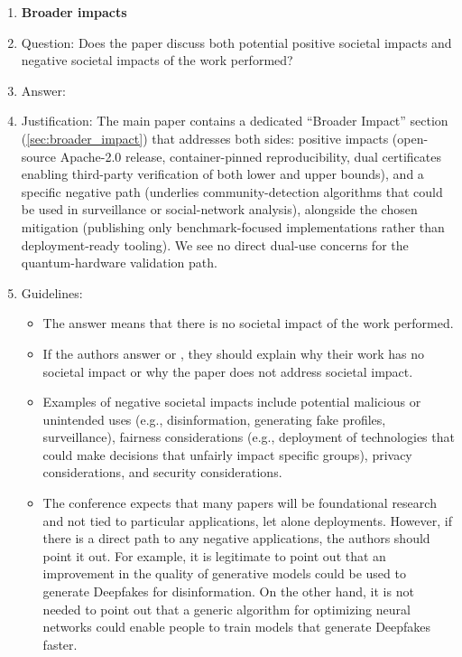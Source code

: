 \begin{enumerate}
\item {\bf Broader impacts}
    \item[] Question: Does the paper discuss both potential positive societal impacts and negative societal impacts of the work performed?
    \item[] Answer: \answerYes{} %
    \item[] Justification: The main paper contains a dedicated
        ``Broader Impact'' section (\cref{sec:broader_impact}) that
        addresses both sides: positive impacts (open-source Apache-2.0
        release, container-pinned reproducibility, dual certificates
        enabling third-party verification of both lower and upper
        bounds), and a specific negative path (\MaxCut underlies
        community-detection algorithms that could be used in
        surveillance or social-network analysis), alongside the chosen
        mitigation (publishing only benchmark-focused implementations
        rather than deployment-ready tooling). We see no direct dual-use
        concerns for the quantum-hardware validation path.
    \item[] Guidelines:
    \begin{itemize}
        \item The answer \answerNA{} means that there is no societal impact of the work performed.
        \item If the authors answer \answerNA{} or \answerNo, they should explain why their work has no societal impact or why the paper does not address societal impact.
        \item Examples of negative societal impacts include potential malicious or unintended uses (e.g., disinformation, generating fake profiles, surveillance), fairness considerations (e.g., deployment of technologies that could make decisions that unfairly impact specific groups), privacy considerations, and security considerations.
        \item The conference expects that many papers will be foundational research and not tied to particular applications, let alone deployments. However, if there is a direct path to any negative applications, the authors should point it out. For example, it is legitimate to point out that an improvement in the quality of generative models could be used to generate Deepfakes for disinformation. On the other hand, it is not needed to point out that a generic algorithm for optimizing neural networks could enable people to train models that generate Deepfakes faster.

\end{itemize}
\end{enumerate}
